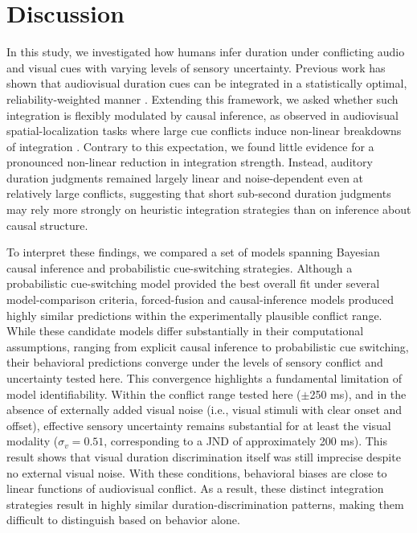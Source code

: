 \documentclass{jov}
\providecommand{\citep}[1]{\cite{#1}}
\begin{document}
\section{Discussion}
In this study, we investigated how humans infer duration under conflicting audio and visual cues with varying levels of sensory uncertainty. Previous work has shown that audiovisual duration cues can be integrated in a statistically optimal, reliability-weighted manner \citep{shams2005sound,hartcher2014duration}. Extending this framework, we asked whether such integration is flexibly modulated by causal inference, as observed in audiovisual spatial-localization tasks where large cue conflicts induce non-linear breakdowns of integration \citep{kording2007causal, badde2021causal,hong2021causal}. Contrary to this expectation, we found little evidence for a pronounced non-linear reduction in integration strength. Instead, auditory duration judgments remained largely linear and noise-dependent even at relatively large conflicts, suggesting that short sub-second duration judgments may rely more strongly on heuristic integration strategies than on inference about causal structure.
 
To interpret these findings, we compared a set of models spanning Bayesian causal inference and probabilistic cue-switching strategies. Although a probabilistic cue-switching model provided the best overall fit under several model-comparison criteria, forced-fusion and causal-inference models produced highly similar predictions within the experimentally plausible conflict range. While these candidate models differ substantially in their computational assumptions, ranging from explicit causal inference to probabilistic cue switching, their behavioral predictions converge under the levels of sensory conflict and uncertainty tested here. This convergence highlights a fundamental limitation of model identifiability. Within the conflict range tested here ($\pm$250 ms), and in the absence of externally added visual noise (i.e., visual stimuli with clear onset and offset), effective sensory uncertainty remains substantial for at least the visual modality ($\sigma_v = 0.51$, corresponding to a JND of approximately 200 ms). This result shows that visual duration discrimination itself was still imprecise despite no external visual noise. With these conditions, behavioral biases are close to linear functions of audiovisual conflict. As a result, these distinct integration strategies result in highly similar duration-discrimination patterns, making them difficult to distinguish based on behavior alone.
\end{document}
